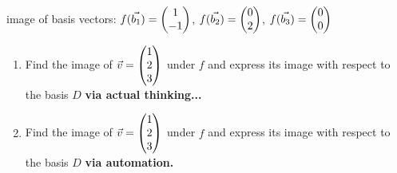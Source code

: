 \documentclass[11pt,fleqn]{article}
\begin{document}
\begin{enumerate}
image of basis vectors: $f(\vec{b_1})=\begin{pmatrix} 1 \\ -1 \end{pmatrix}$, $f(\vec{b_2})=\begin{pmatrix} 0 \\ 2 \end{pmatrix}$, $f(\vec{b_3})=\begin{pmatrix} 0 \\ 0 \end{pmatrix}$

	\begin{enumerate}
	\item Find the image of $\vec{v}=\begin{pmatrix} 1\\2\\3 \end{pmatrix}$ under $f$ and express its image with respect to the basis $D$ \textbf{via actual thinking...}
	\vfill
	\item Find the image of $\vec{v}=\begin{pmatrix} 1\\2\\3 \end{pmatrix}$ under $f$ and express its image with respect to the basis $D$ \textbf{via automation.}
	\vfill
	\end{enumerate}
 

\end{enumerate}
\end{document}
